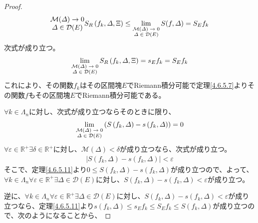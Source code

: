 \documentclass[dvipdfmx]{jsarticle}
\begin{document}
\begin{proof}
\begin{align*}
{\begin{matrix}
\mathcal{M}(\varDelta) \rightarrow 0 \\
\varDelta \in \mathcal{D}(E) \\
\end{matrix}}{S_{R}\left( f_{k},\varDelta,\Xi \right)} \leq \lim_{\scriptsize \begin{matrix}
\mathcal{M}(\varDelta) \rightarrow 0 \\
\varDelta \in \mathcal{D}(E) \\
\end{matrix}}{S(f,\varDelta)} = S_{E}f_{k}
\end{align*}
次式が成り立つ。
\begin{align*}
\lim_{\scriptsize \begin{matrix}
\mathcal{M}(\varDelta) \rightarrow 0 \\
\varDelta \in \mathcal{D}(E) \\
\end{matrix}}{S_{R}\left( f_{k},\varDelta,\Xi \right)} = s_{E}f_{k} = S_{E}f_{k}
\end{align*}
これにより、その関数$f_{k}$はその区間塊$E$でRiemann積分可能で定理\ref{4.6.5.7}よりその関数$f$もその区間塊$E$でRiemann積分可能である。\par
$\forall k \in \varLambda_{n}$に対し、次式が成り立つならそのときに限り、
\begin{align*}
\lim_{\scriptsize \begin{matrix}
\mathcal{M}(\varDelta) \rightarrow 0 \\
\varDelta \in \mathcal{D}(E) \\
\end{matrix}}\left( S\left( f_{k},\varDelta \right) - s\left( f_{k},\varDelta \right) \right) = 0
\end{align*}
$\forall\varepsilon \in \mathbb{R}^{+}\exists\delta \in \mathbb{R}^{+}$に対し、$\mathcal{M}(\varDelta) < \delta$が成り立つなら、次式が成り立つ。
\begin{align*}
\left| S\left( f_{k},\varDelta \right) - s\left( f_{k},\varDelta \right) \right| < \varepsilon
\end{align*}
そこで、定理\ref{4.6.5.11}より$0 \leq S\left( f_{k},\varDelta \right) - s\left( f_{k},\varDelta \right)$が成り立つので、よって、$\forall k \in \varLambda_{n}\forall\varepsilon \in \mathbb{R}^{+}\exists\varDelta \in \mathcal{D}(E)$に対し、$S\left( f_{k},\varDelta \right) - s\left( f_{k},\varDelta \right) < \varepsilon$が成り立つ。\par
逆に、$\forall k \in \varLambda_{n}\forall\varepsilon \in \mathbb{R}^{+}\exists\varDelta \in \mathcal{D}(E)$に対し、$S\left( f_{k},\varDelta \right) - s\left( f_{k},\varDelta \right) < \varepsilon$が成り立つなら、定理\ref{4.6.5.11}より$s\left( f_{k},\varDelta \right) \leq s_{E}f_{k} \leq S_{E}f_{k} \leq S\left( f_{k},\varDelta \right)$が成り立つので、次のようになることから、

\end{proof}
\end{document}

